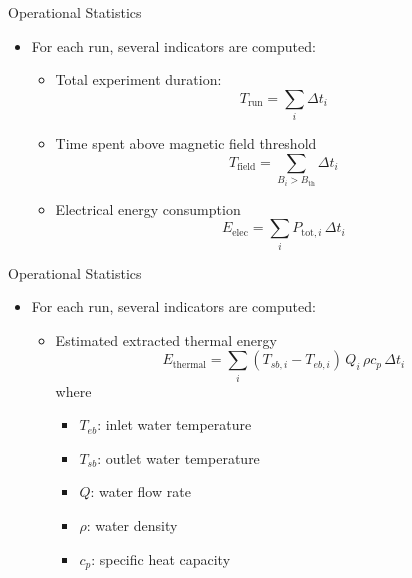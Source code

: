 \documentclass[professionalfonts,aspectratio=169]{beamer}
\begin{document}

\begin{frame}{Operational Statistics}
    \begin{itemize}
        \item For each run, several indicators are computed:
        \begin{itemize}
            \item Total experiment duration:
            \[
            T_{\mathrm{run}} = \sum_i \Delta t_i
            \]
            \item Time spent above magnetic field threshold
            \[
            T_{\mathrm{field}} = \sum_{B_i > B_{\mathrm{th}}}\Delta t_i
            \]
            \item Electrical energy consumption
            \[
            E_{\mathrm{elec}} = \sum_i P_{\mathrm{tot}, i}\,\Delta t_i
            \]
        \end{itemize}
    \end{itemize}
\end{frame}


\begin{frame}{Operational Statistics}
    \begin{itemize}
        \item For each run, several indicators are computed:
        \begin{itemize}
            \item Estimated extracted thermal energy
            \[
            E_{\mathrm{thermal}} = \sum_i (T_{sb, i} - T_{eb, i})\,Q_i\,\rho c_p\,\Delta t_i
            \]
            where
            \begin{itemize}
                \item $T_{eb}$: inlet water temperature
                \item $T_{sb}$: outlet water temperature
                \item $Q$: water flow rate
                \item $\rho$: water density
                \item $c_p$: specific heat capacity
            \end{itemize}
        \end{itemize}
    \end{itemize}
\end{frame}
\end{document}
